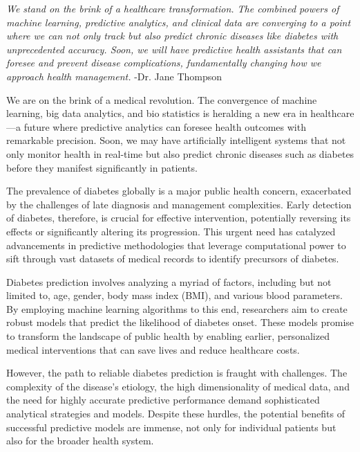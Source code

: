 \documentclass[a4paper,num-refs,gigabyte]{oup-contemporary}
\begin{document}
\emph{We stand on the brink of a healthcare transformation. The combined powers of machine learning, predictive analytics, and clinical data are converging to a point where we can not only track but also predict chronic diseases like diabetes with unprecedented accuracy. Soon, we will have predictive health assistants that can foresee and prevent disease complications, fundamentally changing how we approach health management.}
-Dr. Jane Thompson

We are on the brink of a medical revolution. The convergence of machine learning, big data analytics, and bio statistics is heralding a new era in healthcare—a future where predictive analytics can foresee health outcomes with remarkable precision. Soon, we may have artificially intelligent systems that not only monitor health in real-time but also predict chronic diseases such as diabetes before they manifest significantly in patients.

The prevalence of diabetes globally is a major public health concern, exacerbated by the challenges of late diagnosis and management complexities. Early detection of diabetes, therefore, is crucial for effective intervention, potentially reversing its effects or significantly altering its progression. This urgent need has catalyzed advancements in predictive methodologies that leverage computational power to sift through vast datasets of medical records to identify precursors of diabetes.

Diabetes prediction involves analyzing a myriad of factors, including but not limited to, age, gender, body mass index (BMI), and various blood parameters. By employing machine learning algorithms to this end, researchers aim to create robust models that predict the likelihood of diabetes onset. These models promise to transform the landscape of public health by enabling earlier, personalized medical interventions that can save lives and reduce healthcare costs.

However, the path to reliable diabetes prediction is fraught with challenges. The complexity of the disease's etiology, the high dimensionality of medical data, and the need for highly accurate predictive performance demand sophisticated analytical strategies and models. Despite these hurdles, the potential benefits of successful predictive models are immense, not only for individual patients but also for the broader health system.
\end{document}
